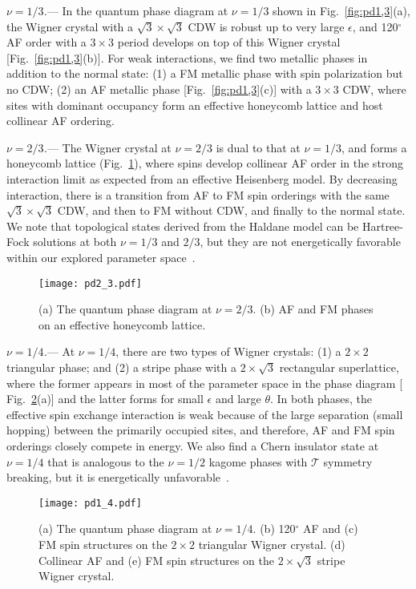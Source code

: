 \documentclass[aps,prl,floatfix,twocolumn]{revtex4-1}
\begin{document}
\textit{$\nu=1/3$.}--- In the quantum phase diagram at $\nu=1/3$ shown in Fig.~\ref{fig:pd1,3}(a),  the Wigner crystal with a $\sqrt{3}\times \sqrt{3}$ CDW is robust up to very large $\epsilon$, and 120$^{\circ}$ AF order with a $3 \times 3$ period develops on top of this Wigner crystal [Fig.~\ref{fig:pd1,3}(b)]. For weak interactions, we find two metallic phases in addition to the normal state: (1) a FM metallic phase with spin polarization but no CDW; (2) an AF metallic phase [Fig.~\ref{fig:pd1,3}(c)] with a $3\times 3 $ CDW, where sites with dominant occupancy form an effective honeycomb lattice and host collinear AF ordering.



\textit{$\nu=2/3$.}--- The Wigner crystal at $\nu=2/3$ is dual to that at $\nu=1/3$, and forms a honeycomb lattice (Fig.~\ref{fig:pd2,3}), where spins develop collinear AF order in the strong interaction limit as expected from an effective Heisenberg model. By decreasing interaction, there is a transition from AF to FM spin orderings with the same $\sqrt{3} \times \sqrt{3} $ CDW, and then to FM without CDW, and finally to the normal state. We note that topological states derived from the Haldane model \cite{haldane1988model} can be Hartree-Fock solutions at both $\nu=1/3$ and $2/3$, but they are not energetically favorable within our explored parameter space~\cite{SM}. 


\begin{figure}[t]
	\centering
	\texttt{[image: pd2\_3.pdf]}
	\caption{(a) The quantum phase diagram at $ \nu=2/3 $. (b)  AF and FM phases on an effective honeycomb lattice.}
	\label{fig:pd2,3}
\end{figure}

\textit{$\nu=1/4$.}--- At $\nu=1/4$, there are two types of Wigner crystals: (1) a $2\times 2$ triangular phase; and (2) a stripe phase with a $2\times \sqrt{3}$ rectangular superlattice, where the former appears in most of the parameter space in the phase diagram [ Fig.~\ref{fig:pd1,4}(a)] and the latter forms for small $\epsilon$ and large $\theta$. In both phases, the effective spin exchange interaction is weak because of the large separation (small hopping) between the primarily occupied sites, and therefore, AF and FM spin orderings closely compete in energy. We also find a Chern insulator state at $\nu=1/4$ that is analogous to the $\nu=1/2$ kagome phases with  $\mathcal{T}$ symmetry breaking, but it is energetically unfavorable~\cite{SM}.


\begin{figure}[t]
	\centering
	\texttt{[image: pd1\_4.pdf]}
	\caption{(a) The quantum phase diagram at $ \nu= 1/4 $. (b)  120$^{\circ}$ AF and (c) FM spin structures  on the $2\times 2$ triangular Wigner crystal. (d) Collinear AF and (e) FM spin structures on the $2 \times \sqrt{3} $ stripe Wigner crystal. }
	\label{fig:pd1,4}
\end{figure}				
\end{document}
